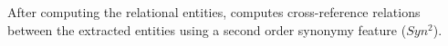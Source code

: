After computing the relational entities, 
\framework computes cross-reference relations between the extracted entities using a second order synonymy feature ($Syn^2$).
